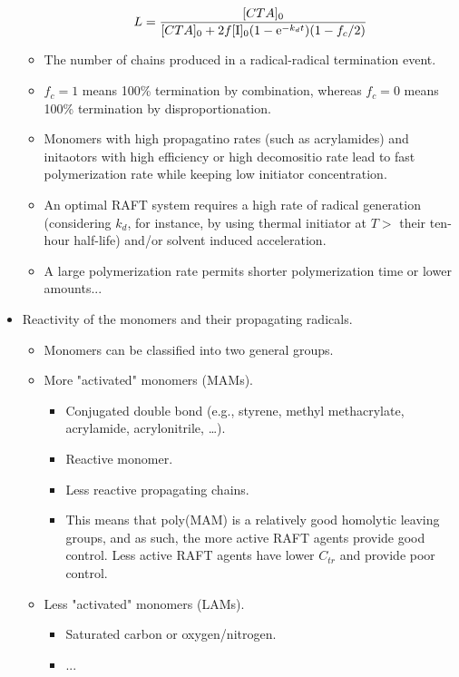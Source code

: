 \documentclass[../notes.tex]{subfiles}
\begin{document}
\begin{itemize}
\begin{itemize}
        \begin{equation*}
            L = \frac{[CTA]_0}{[CTA]_0+2f[\ce{I}]_0(1-\e[-k_dt])(1-f_c/2)}
        \end{equation*}
        \item The number of chains produced in a radical-radical termination event.
        \item $f_c=1$ means 100\% termination by combination, whereas $f_c=0$ means 100\% termination by disproportionation.
        \item Monomers with high propagatino rates (such as acrylamides) and initaotors with high efficiency or high decomositio rate lead to fast polymerization rate while keeping low initiator concentration.
        \item An optimal RAFT system requires a high rate of radical generation (considering $k_d$, for instance, by using thermal initiator at $T>$ their ten-hour half-life) and/or solvent induced acceleration.
        \item A large polymerization rate permits shorter polymerization time or lower amounts...
    \end{itemize}
    \item Reactivity of the monomers and their propagating radicals.
    \begin{itemize}
        \item Monomers can be classified into two general groups.
        \item More "activated" monomers (MAMs).
        \begin{itemize}
            \item Conjugated double bond (e.g., styrene, methyl methacrylate, acrylamide, acrylonitrile, \dots).
            \item Reactive monomer.
            \item Less reactive propagating chains.
            \item This means that poly(MAM) is a relatively good homolytic leaving groups, and as such, the more active RAFT agents provide good control. Less active RAFT agents have lower $C_{tr}$ and provide poor control.
        \end{itemize}
        \item Less "activated" monomers (LAMs).
        \begin{itemize}
            \item Saturated carbon or oxygen/nitrogen.
            \item ...
        \end{itemize}

\end{itemize}
\end{itemize}
\end{document}
